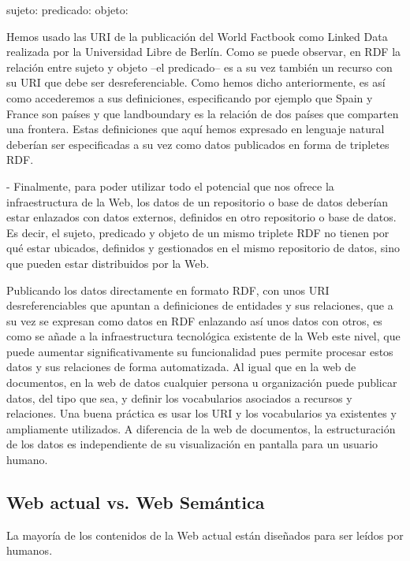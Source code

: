 sujeto: %
predicado: %
objeto: %

Hemos usado las URI de la publicación del World Factbook como Linked Data realizada por la Universidad Libre de Berlín. Como se puede observar, en RDF la relación entre sujeto y objeto –el predicado– es a su vez también un recurso con su URI que debe ser desreferenciable. Como hemos dicho anteriormente, es así como accederemos a sus definiciones, especificando por ejemplo que Spain y France son países y que landboundary es la relación de dos países que comparten una frontera. Estas definiciones que aquí hemos expresado en lenguaje natural deberían ser especificadas a su vez como datos publicados en forma de tripletes RDF.

- Finalmente, para poder utilizar todo el potencial que nos ofrece la infraestructura de la Web, los datos de un repositorio o base de datos deberían estar enlazados con datos externos, definidos en otro repositorio o base de datos. Es decir, el sujeto, predicado y objeto de un mismo triplete RDF no tienen por qué estar ubicados, definidos y gestionados en el mismo repositorio de datos, sino que pueden estar distribuidos por la Web.

Publicando los datos directamente en formato RDF, con unos URI desreferenciables que apuntan a definiciones de entidades y sus relaciones, que a su vez se expresan como datos en RDF enlazando así unos datos con otros, es como se añade a la infraestructura tecnológica existente de la Web este nivel, que puede aumentar significativamente su funcionalidad pues permite procesar estos datos y sus relaciones de forma automatizada. Al igual que en la web de documentos, en la web de datos cualquier persona u organización puede publicar datos, del tipo que sea, y definir los vocabularios asociados a recursos y relaciones. Una buena práctica es usar los URI y los vocabularios ya existentes y ampliamente utilizados. A diferencia de la web de documentos, la estructuración de los datos es independiente de su visualización en pantalla para un usuario humano.

\subsection{Web actual vs. Web Semántica} %

La mayoría de los contenidos de la Web actual están diseñados para ser leídos por humanos.

